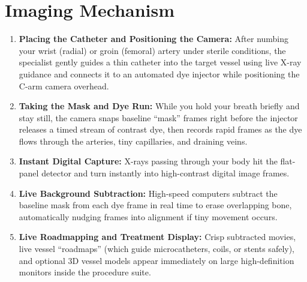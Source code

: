 \section{Imaging Mechanism}
\begin{enumerate}
\item \textbf{Placing the Catheter and Positioning the Camera:} After numbing your wrist (radial) or groin (femoral) artery under sterile conditions, the specialist gently guides a thin catheter into the target vessel using live X-ray guidance and connects it to an automated dye injector while positioning the C-arm camera overhead.
\item \textbf{Taking the Mask and Dye Run:} While you hold your breath briefly and stay still, the camera snaps baseline ``mask'' frames right before the injector releases a timed stream of contrast dye, then records rapid frames as the dye flows through the arteries, tiny capillaries, and draining veins.
\item \textbf{Instant Digital Capture:} X-rays passing through your body hit the flat-panel detector and turn instantly into high-contrast digital image frames.
\item \textbf{Live Background Subtraction:} High-speed computers subtract the baseline mask from each dye frame in real time to erase overlapping bone, automatically nudging frames into alignment if tiny movement occurs.
\item \textbf{Live Roadmapping and Treatment Display:} Crisp subtracted movies, live vessel ``roadmaps'' (which guide microcatheters, coils, or stents safely), and optional 3D vessel models appear immediately on large high-definition monitors inside the procedure suite.
\end{enumerate}

